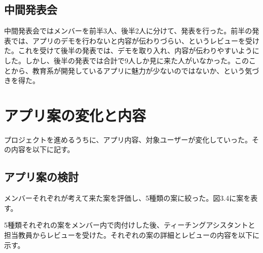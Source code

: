 \documentclass[openany,11pt,papersize]{jsbook}
\begin{document}

\subsection{中間発表会}
\par 中間発表会ではメンバーを前半3人、後半2人に分けて、発表を行った。前半の発表では、アプリのデモを行わないと内容が伝わりづらい、というレビューを受けた。これを受けて後半の発表では、デモを取り入れ、内容が伝わりやすいようにした。しかし、後半の発表では合計で9人しか見に来た人がいなかった。このことから、教育系が開発しているアプリに魅力が少ないのではないか、という気づきを得た。


\section{アプリ案の変化と内容}
\par プロジェクトを進めるうちに、アプリ内容、対象ユーザーが変化していった。その内容を以下に記す。

\subsection{アプリ案の検討}
\par メンバーそれぞれが考えて来た案を評価し、5種類の案に絞った。図3.4に案を表す。

\par 5種類それぞれの案をメンバー内で肉付けした後、ティーチングアシスタントと担当教員からレビューを受けた。それぞれの案の詳細とレビューの内容を以下に示す。
\end{document}
